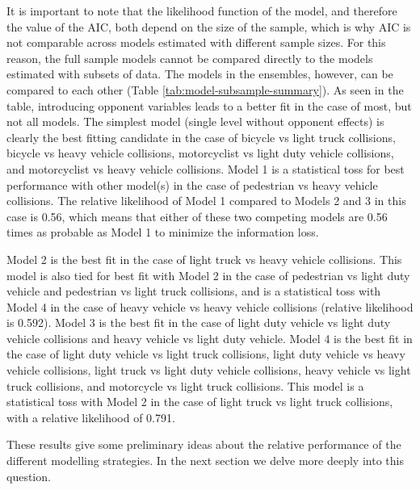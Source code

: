 \documentclass[]{elsarticle} %
\begin{document}
It is important to note that the likelihood function of the model, and
therefore the value of the AIC, both depend on the size of the sample,
which is why AIC is not comparable across models estimated with
different sample sizes. For this reason, the full sample models cannot
be compared directly to the models estimated with subsets of data. The
models in the ensembles, however, can be compared to each other (Table
\ref{tab:model-subsample-summary}). As seen in the table, introducing
opponent variables leads to a better fit in the case of most, but not
all models. The simplest model (single level without opponent effects)
is clearly the best fitting candidate in the case of bicycle vs light
truck collisions, bicycle vs heavy vehicle collisions, motorcyclist vs
light duty vehicle collisions, and motorcyclist vs heavy vehicle
collisions. Model 1 is a statistical toss for best performance with
other model(s) in the case of pedestrian vs heavy vehicle collisions.
The relative likelihood of Model 1 compared to Models 2 and 3 in this
case is 0.56, which means that either of these two competing models are
0.56 times as probable as Model 1 to minimize the information loss.

Model 2 is the best fit in the case of light truck vs heavy vehicle
collisions. This model is also tied for best fit with Model 2 in the
case of pedestrian vs light duty vehicle and pedestrian vs light truck
collisions, and is a statistical toss with Model 4 in the case of heavy
vehicle vs heavy vehicle collisions (relative likelihood is 0.592).
Model 3 is the best fit in the case of light duty vehicle vs light duty
vehicle collisions and heavy vehicle vs light duty vehicle. Model 4 is
the best fit in the case of light duty vehicle vs light truck
collisions, light duty vehicle vs heavy vehicle collisions, light truck
vs light duty vehicle collisions, heavy vehicle vs light truck
collisions, and motorcycle vs light truck collisions. This model is a
statistical toss with Model 2 in the case of light truck vs light truck
collisions, with a relative likelihood of 0.791.

These results give some preliminary ideas about the relative performance
of the different modelling strategies. In the next section we delve more
deeply into this question.
\end{document}
